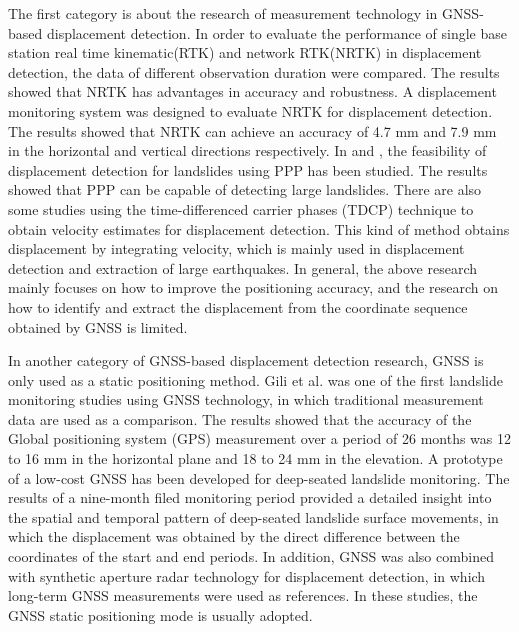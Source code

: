 \documentclass[journal]{IEEEtran}
\begin{document}
	The first category is about the research of measurement technology in GNSS-based displacement detection.
	In order to evaluate the performance of single base station real time kinematic(RTK) and network RTK(NRTK) in displacement detection, the data of different observation duration were compared\cite{wang2011gps}. The results showed that NRTK has advantages in accuracy and robustness.
	A displacement monitoring system was designed to evaluate NRTK for displacement detection\cite{GUMUS2019131}. The results showed that NRTK can achieve an accuracy of 4.7 mm and 7.9 mm in the horizontal and vertical directions respectively.
	In \cite{csanliouglu2016landslide} and \cite{lytvyn2012real}, the feasibility of displacement detection for landslides  using PPP has been studied. The results showed that PPP can be capable of detecting large landslides.
	There are also some studies using the time-differenced carrier phases (TDCP) technique\cite{freda2015time,colosimo2011real} to obtain velocity estimates for displacement detection. This kind of method obtains displacement by integrating velocity, which is mainly used in displacement detection and extraction of large earthquakes.
	In general, the above research mainly focuses on how to improve the positioning accuracy, and the research on how to identify and extract the displacement from the coordinate sequence obtained by GNSS is limited.
	
	In another category of GNSS-based displacement detection research, GNSS is only used as a static positioning method.
	Gili et al.\cite{gili2000using} was one of the first landslide monitoring studies using GNSS technology, in which traditional measurement data are used as a comparison. 
	The results showed that the accuracy of the Global positioning system (GPS) measurement over a period of 26 months was 12 to 16 mm in the horizontal plane and 18 to 24 mm in the elevation.
	A prototype of a low-cost GNSS has been developed for deep-seated landslide monitoring\cite{rs12203375}. 
	The results of a nine-month filed monitoring period provided a detailed insight into the spatial and temporal pattern of deep-seated landslide surface movements, in which the displacement was obtained by the direct difference between the coordinates of the start and end periods.
	In addition, GNSS was also combined with synthetic aperture radar technology for displacement detection, in which long-term GNSS measurements were used as references\cite{atanasova2018ground,fuhrmann2015estimation}.
	In these studies, the GNSS static positioning mode is usually adopted.
	
\end{document}
